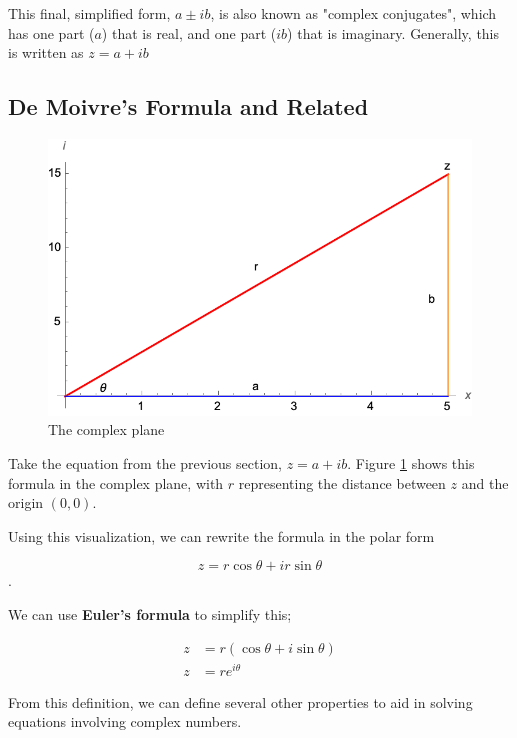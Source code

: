 \documentclass[12pt]{article}
\begin{document}
This final, simplified form, $a \pm ib$, is also known as "complex conjugates", which has one part ($a$) that is real, and one part ($ib$) that is imaginary. Generally, this is written as $z = a + ib$

\subsection{De Moivre's Formula and Related}

\begin{figure}
    \centering
    \includegraphics{misc/imaginary.png}
    \caption{The complex plane}
    \label{fig:imaginary}
\end{figure}

Take the equation from the previous section, $z = a + ib$. Figure \ref{fig:imaginary} shows this formula in the complex plane, with $r$ representing the distance between $z$ and the origin $(0,0)$.

Using this visualization, we can rewrite the formula in the polar form

$$z = r \cos \theta + i r \sin \theta$$.

We can use \textbf{Euler's formula} to simplify this;

\begin{equation}
    \begin{split}
        z &= r(\cos \theta + i \sin \theta)\\
        z &= r e^{i\theta}
    \end{split}
\end{equation}

From this definition, we can define several other properties to aid in solving equations involving complex numbers.
\end{document}
